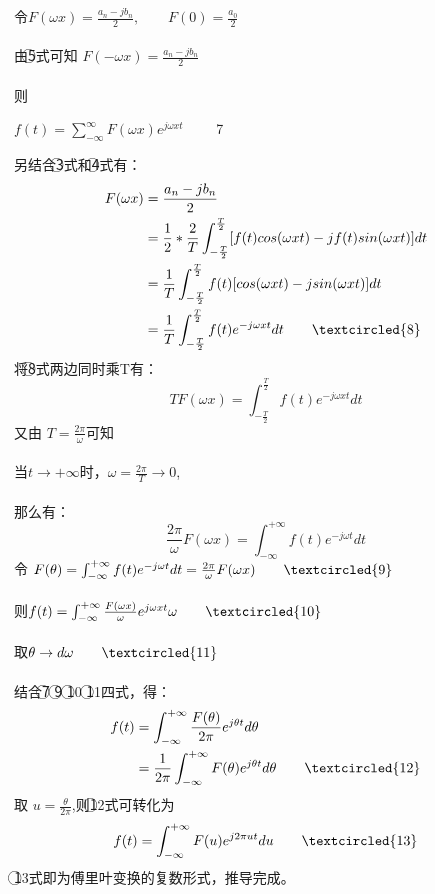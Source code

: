 \documentclass[UTF8]{article}
\begin{document}
令$F(\omega x) = \frac{a_{n}-j b_{n}}{2},\qquad F(0) = \frac{a_{0}}{2}$
\\ 
\\ 由\textcircled{5}式可知 $F(-\omega x) = \frac{a_{n}-j b_{n}}{2}$
\\ 
\\ 则 \begin{center}
           $f(t) = \sum_{-\infty}^{\infty}F(\omega x) e^{j\omega xt}\qquad$ \textcircled{7}
         \end{center}
 另结合\textcircled{3}式和\textcircled{4}式有：
\begin{displaymath}
  \begin{aligned}
  F(\omega x) &= \frac{a_{n} - j b_{n}}{2}
  \\ &= \frac{1}{2} * \frac{2}{T} \int_{-\frac{T}{2}}^{\frac{T}{2}}
  [f(t)cos(\omega xt) - j f(t)sin(\omega xt)]dt
  \\ &= \frac{1}{T} \int_{-\frac{T}{2}}^{\frac{T}{2}}
  f(t)[cos(\omega xt) - jsin(\omega xt)]dt
  \\ &= \frac{1}{T} \int_{-\frac{T}{2}}^{\frac{T}{2}}
  f(t)e^{-j\omega xt}dt \qquad \textcircled{8}
  \end{aligned}
\end{displaymath}
 将\textcircled{8}式两边同时乘T有：
 \begin{displaymath}
   TF(\omega x) = \int_{-\frac{T}{2}}^{\frac{T}{2}} f(t)e^{-j\omega xt}dt
 \end{displaymath}
 又由 $T = \frac{2\pi}{\omega} $可知
 \\
 \\ 当$t \to +\infty$时，$\omega = \frac{2\pi}{T} \to 0$,
 \\
 \\ 那么有：
 \begin{displaymath}
   \frac{2\pi}{\omega}F(\omega x) = \int_{-\infty}^{+\infty} f(t)e^{-j\omega t} dt
 \end{displaymath}
 令 $F(\theta) = \int_{-\infty}^{+\infty} f(t)e^{-j\omega t}dt = \frac{2\pi}{\omega}F(\omega x) \qquad \textcircled{9}$
 \\
 \\ 则$f(t) =  \int_{-\infty}^{+\infty}\frac{F(\omega x)}{\omega} e^{j\omega xt}\omega \qquad \textcircled{10} $
 \\
 \\ 取$\theta \to d\omega \qquad \textcircled{11}$
 \\
 \\ 结合\textcircled{7} \textcircled{9} \textcircled{10} \textcircled{11}四式，得：
 \begin{displaymath}
  \begin{aligned}
  f(t) &= \int_{-\infty}^{+\infty} \frac{F(\theta)}{2\pi} e^{j\theta t}d\theta
  \\ &= \frac{1}{2\pi}\int_{-\infty}^{+\infty} F(\theta) e^{j\theta t} d\theta \qquad \textcircled{12}
  \end{aligned}
\end{displaymath}
取 $ u = \frac{\theta}{2\pi}$,则\textcircled{12}式可转化为
\begin{displaymath}
  f(t) = \int_{-\infty}^{+\infty} F(u)e^{j2\pi ut}du \qquad \textcircled{13}
\end{displaymath}
\textcircled{13}式即为傅里叶变换的复数形式，推导完成。
\end{document}
